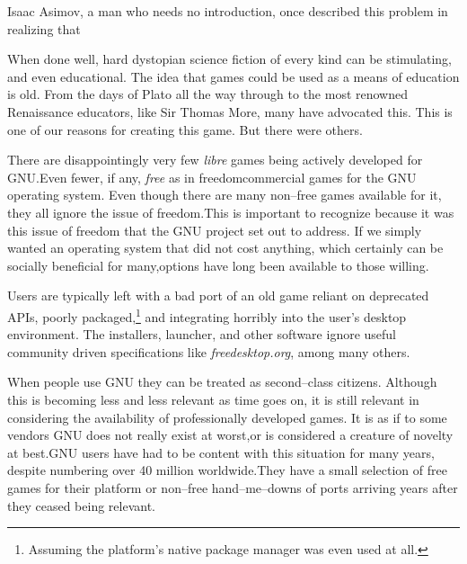 Isaac Asimov, a man who needs no introduction, once described this problem in realizing that \footnotecite[extras={, p.~73.}][asimov1981]

When done well, hard dystopian science fiction of every kind can be stimulating, and even educational. The idea that games could be used as a means of education is old. From the days of Plato all the way through to the most renowned Renaissance educators, like Sir Thomas More, many have advocated this. This is one of our reasons for creating this game. But there were others.

There are disappointingly very few {\it libre} games being actively developed for GNU. Even fewer, if any, {\it free} as in freedom commercial games for the GNU operating system. Even though there are many non--free games available for it, they all ignore the issue of freedom. This is important to recognize because it was this issue of freedom that the GNU project set out to address. If we simply wanted an operating system that did not cost anything, which certainly can be socially beneficial for many, options have long been available to those willing.\footnotecite[piratebay]

Users are typically left with a bad port of an old game reliant on deprecated APIs, poorly packaged,\footnote{Assuming the platform's native package manager was even used at all.} and integrating horribly into the user's desktop environment. The installers, launcher, and other software ignore useful community driven specifications like {\it freedesktop.org}, among many others.

When people use GNU they can be treated as second--class citizens. Although this is becoming less and less relevant as time goes on, it is still relevant in considering the availability of professionally developed games. It is as if to some vendors GNU does not really exist at worst, or is considered a creature of novelty at best. GNU users have had to be content with this situation for many years, despite numbering over 40 million worldwide. They have a small selection of free games for their platform or non--free hand--me--downs of ports arriving years after they ceased being relevant.

